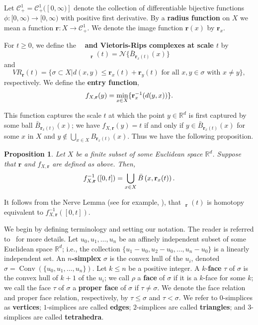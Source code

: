 \documentclass{amsart}
\newtheorem*{fibering lemma}{Fibering Lemma}
\newtheorem*{decomposition lemma}{Decomposition Lemma}
\newtheorem*{hurewicz theorem}{Hurewicz Theorem}
\newtheorem{proposition}[theorem]{Proposition}
\theoremstyle{definition}
\newcommand{\df}[1]{{{\bf #1}}}
\newcommand{\Ball}{\bar{B}}
\DeclareMathOperator{\Cech}{\check{C}ech}
\DeclareMathOperator{\Conv}{Conv}
\begin{document}
Let $\mathcal{C}^1_+=\mathcal{C}^1_+([0,\infty)]$ denote the collection of differentiable bijective functions $\phi:[0,\infty)\to[0,\infty)$ with positive first derivative. By a \df{radius function} on $X$ we mean a function $\mathbf{r}:X\to \mathcal{C}^1_+$. We denote the image function $\mathbf{r}(x)$ by $\mathbf{r}_x$.

For $t \geq 0$, we define the \df{$\Cech$ and Vietoris-Rips complexes at scale $t$} by \[\Cech_{\mathbf{r}}(t) = \mathcal{N}\{\Ball_{\mathbf{r}_x(t)}(x)\}\] and \[VR_{\mathbf{r}}(t) = \{\sigma \subset X | d(x,y) \leq \mathbf{r}_x(t) + \mathbf{r}_y(t) \text{ for all $x,y \in \sigma$ with $x\neq y$}\},\] respectively.
 We define the \df{entry function}, \begin{equation} \label{eq:entry_function}
      f_{X,\mathbf{r}}(y)=\min_{x\in X}\{\mathbf{r}^{-1}_{x}(d(y,x))\}\hbox{.}\end{equation} 
      
      This function captures the scale $t$ at which the point $y\in\mathbb{R}^d$ is first captured by some ball $\Ball_{\mathbf{r}_x(t)}(x)$; we have $f_{X, \mathbf{r}}(y) = t$ if and only if $y \in \Ball_{\mathbf{r}_x(t)}(x)$ for some $x$ in $X$ and $y \not \in \bigcup_{x \in X} B_{\mathbf{r}_x(t)}(x)$. Thus we have the following proposition.

\begin{proposition}
Let $X$ be a finite subset of some Euclidean space $\mathbb{R}^d$. Suppose that $\mathbf{r}$ and $f_{X,\mathbf{r}}$ are defined as above. Then, \[f^{-1}_{X,\mathbf{r}}\left( [0,t]\right)=\bigcup_{x \in X}\Ball\left(x,\mathbf{r}_{x}(t)\right)\hbox{.}\]
\end{proposition}

It follows from the Nerve Lemma (see for example, \cite[Corollary 4G.3]{Hatcher}), that $\Cech_{\mathbf{r}}(t)$ is homotopy equivalent to $f^{-1}_{X,\mathbf{r}}\left([0,t]\right)$.

\iffalse

We begin by defining terminology and setting our notation. The reader is referred to~\cite{Ede:10,Rotman} for more details.
Let $u_0,u_1,\ldots,u_n$ be an affinely independent subset of some Euclidean space $\mathbb{R}^d$; i.e., the collection $\{u_1-u_0,u_2-u_0,\ldots, u_n-u_0\}$ is a linearly independent set. An \df{$n$-simplex} $\sigma$ is the convex hull of the $u_i$, denoted $\sigma = \Conv(\{u_0, u_1, \ldots, u_n\})$. Let $k\le n$ be a positive integer. A $k$-\df{face} $\tau$ of $\sigma$ is the convex hull of $k+1$ of the $u_i$; we call $\rho$ a \df{face} of $\sigma$ if it is a $k$-face for some $k$; we call the face $\tau$ of $\sigma$ a \df{proper face} of $\sigma$ if $\tau\neq\sigma$. We denote the face relation and proper face relation, respectively, by $\tau \leq \sigma$ and $\tau < \sigma$. We refer to $0$-simplices as \df{vertices}; $1$-simplices are called \df{edges}; $2$-simplices are called \df{triangles}; and $3$-simplices are called \df{tetrahedra}.
\end{document}
